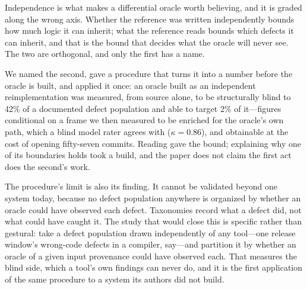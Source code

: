 Independence is what makes a differential oracle worth believing, and it is graded
along the wrong axis. Whether the reference was written independently bounds how
much logic it can inherit; what the reference reads bounds which defects it can
inherit, and that is the bound that decides what the oracle will never see. The two
are orthogonal, and only the first has a name.

We named the second, gave a procedure that turns it into a number before the oracle
is built, and applied it once: an oracle built as an independent reimplementation was
measured, from source alone, to be structurally blind to 42\% of a documented defect
population and able to target 2\% of it---figures conditional on a frame we then
measured to be enriched for the oracle's own path, which a blind model rater agrees with ($\kappa = 0.86$),
and obtainable at the cost of opening fifty-seven commits. Reading gave the bound; explaining why one of its boundaries holds took a
build, and the paper does not claim the first act does the second's work.

The procedure's limit is also its finding. It cannot be validated beyond one system
today, because no defect population anywhere is organized by whether an oracle could
have observed each defect. Taxonomies record what a defect did, not what could have
caught it. The study that would close this is specific rather than gestural: take a
defect population drawn independently of any tool---one release window's
wrong-code defects in a compiler, say---and partition it by whether an oracle of a
given input provenance could have observed each. That measures the blind side, which
a tool's own findings can never do, and it is the first application of the same
procedure to a system its authors did not build.
